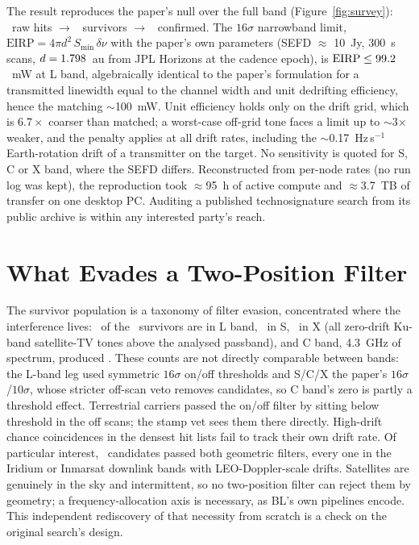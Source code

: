 \documentclass[RNAAS]{aastex631}
\begin{document}
The result reproduces the paper's null over the full band (Figure~\ref{fig:survey}):
\aiTotRawHits\ raw hits $\to$ \aiTotSurvivors\ survivors $\to$ \aiTotConfirmed\
confirmed. The $16\sigma$ narrowband limit,
$\mathrm{EIRP} = 4\pi d^{2}\,S_\mathrm{min}\,\delta\nu$ with the paper's own parameters
(SEFD $\approx$ 10~Jy, 300~s scans, $d=1.798$~au from JPL Horizons at the
cadence epoch), is $\mathrm{EIRP} \le 99.2$~mW at L band, algebraically identical
to the paper's formulation \citep{gajjar2021} for a transmitted linewidth equal to the
channel width and unit dedrifting efficiency, hence the matching $\sim$100~mW. Unit
efficiency holds only on the drift grid, which is $6.7\times$ coarser than matched; a
worst-case off-grid tone faces a limit up to $\sim$3$\times$ weaker, and the penalty applies
at all drift rates, including the $\sim$0.17~Hz\,s$^{-1}$ Earth-rotation drift of a
transmitter on the target. No sensitivity is
quoted for S, C or X band, where the SEFD differs. Reconstructed from per-node rates (no
run log was kept), the reproduction took $\approx$95~h of active compute and
$\approx$3.7~TB of transfer on one desktop PC. Auditing a published technosignature
search from its public archive is within any interested party's reach.

\section{What Evades a Two-Position Filter}

The survivor population is a taxonomy of filter evasion, concentrated where the
interference lives: \aiLSurvivors\ of the \aiTotSurvivors\ survivors are in L band,
\aiSSurvivors\ in S, \aiXSurvivors\ in X (all zero-drift Ku-band satellite-TV tones
above the analysed passband), and C band, 4.3~GHz of spectrum, produced
\aiCSurvivors. These counts are not directly comparable between bands: the L-band leg used
symmetric $16\sigma$ on/off thresholds and S/C/X the paper's $16\sigma$/$10\sigma$, whose
stricter off-scan veto removes candidates, so C band's zero is partly a threshold effect. Terrestrial carriers passed the on/off filter by sitting below threshold
in the off scans; the stamp vet sees them there directly. High-drift chance
coincidences in the densest hit lists fail to track their own drift rate. Of
particular interest, \aiSatCoherent\ candidates passed both geometric filters, every one in the Iridium or
Inmarsat downlink bands with LEO-Doppler-scale drifts. Satellites are genuinely in the
sky and intermittent, so no two-position filter can reject them by geometry; a
frequency-allocation axis is necessary, as BL's own pipelines encode. This independent
rediscovery of that necessity from scratch is a check on the original search's design.
\end{document}
